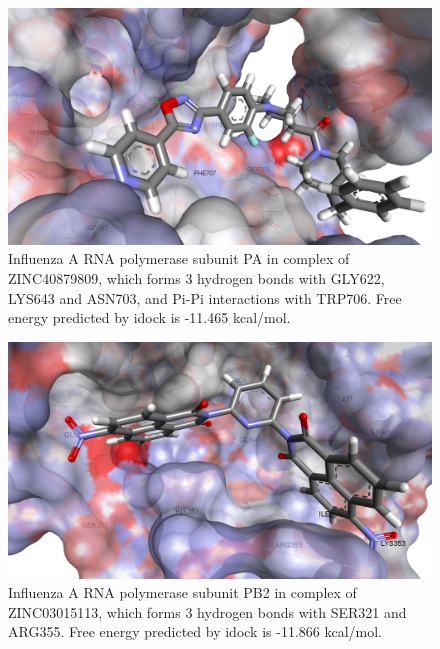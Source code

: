 \begin{figure}
\centering
\includegraphics[width=\linewidth]{../influenza/2ZNL-ZINC40879809.png}
\caption{Influenza A RNA polymerase subunit PA in complex of ZINC40879809, which forms 3 hydrogen bonds with GLY622, LYS643 and ASN703, and Pi-Pi interactions with TRP706. Free energy predicted by idock is -11.465 kcal/mol.}
\label{Case:2ZNL-ZINC40879809}
\end{figure}

\begin{figure}
\centering
\includegraphics[width=\linewidth]{../influenza/2VQZ-ZINC03015113.png}
\caption{Influenza A RNA polymerase subunit PB2 in complex of ZINC03015113, which forms 3 hydrogen bonds with SER321 and ARG355. Free energy predicted by idock is -11.866 kcal/mol.}
\label{Case:2VQZ-ZINC03015113}
\end{figure}

